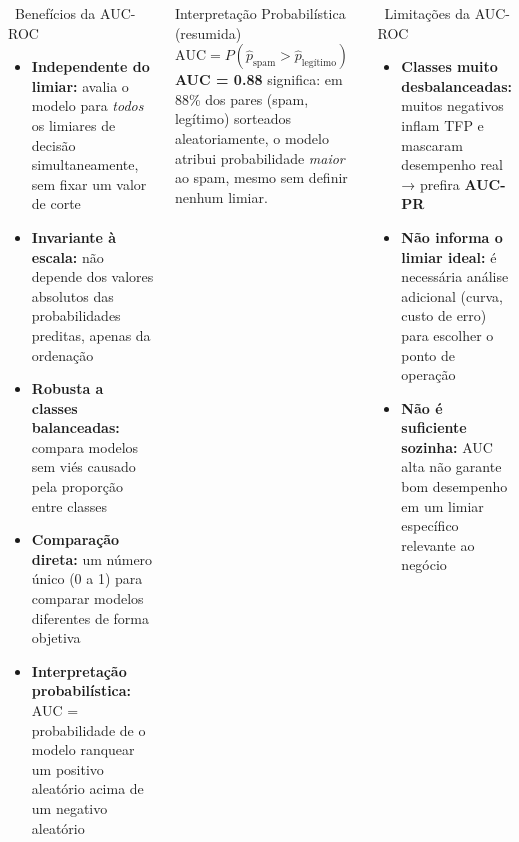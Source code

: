 \documentclass[aspectratio=169]{beamer}
\begin{document}
\begin{frame}{}
  \vspace{-0.8cm}
  \footnotesize
\begin{columns}[T]

\begin{block}{\faThumbsUp\ Benefícios da AUC-ROC}
  \begin{itemize}
    \item \textbf{Independente do limiar:} avalia o modelo para \textit{todos} os limiares de decisão simultaneamente, sem fixar um valor de corte
    \vspace{0.2em}
    \item \textbf{Invariante à escala:} não depende dos valores absolutos das probabilidades preditas, apenas da ordenação
    \vspace{0.2em}
    \item \textbf{Robusta a classes balanceadas:} compara modelos sem viés causado pela proporção entre classes
    \vspace{0.2em}
    \item \textbf{Comparação direta:} um número único (0 a 1) para comparar modelos diferentes de forma objetiva
    \vspace{0.2em}
    \item \textbf{Interpretação probabilística:} AUC = probabilidade de o modelo ranquear um positivo aleatório acima de um negativo aleatório
  \end{itemize}
\end{block}


\begin{exampleblock}{Interpretação Probabilística (resumida)}
  \footnotesize
  $\text{AUC} = P(\hat{p}_{\text{spam}} > \hat{p}_{\text{legítimo}})$\\[6pt]
  \textbf{AUC = 0.88} significa: em 88\% dos pares (spam, legítimo) sorteados aleatoriamente, o modelo atribui probabilidade \textit{maior} ao spam, mesmo sem definir nenhum limiar.
\end{exampleblock}

\vspace{0.4em}

\begin{alertblock}{\faWarning\ Limitações da AUC-ROC}
  \begin{itemize}\footnotesize
    \item \textbf{Classes muito desbalanceadas:} muitos negativos inflam TFP e mascaram desempenho real → prefira \textbf{AUC-PR}
    \item \textbf{Não informa o limiar ideal:} é necessária análise adicional (curva, custo de erro) para escolher o ponto de operação
    \item \textbf{Não é suficiente sozinha:} AUC alta não garante bom desempenho em um limiar específico relevante ao negócio
  \end{itemize}
\end{alertblock}


\end{columns}
\end{frame}
\end{document}
